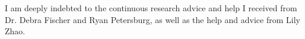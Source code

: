 \newpage
\thispagestyle{empty} %
\addtocounter{page}{-1} %
\begin{flushright}
\vspace*{\fill}
I am deeply indebted to the continuous research advice and help I received from Dr. Debra Fischer and Ryan Petersburg, as well as the help and advice from Lily Zhao.
\vspace*{\fill}
\end{flushright}
